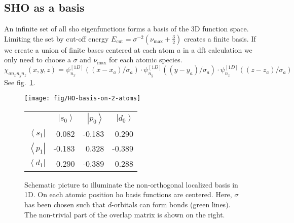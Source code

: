 \documentclass[oribibl]{llncs}
\newcommand{\um}[1]{_{\mathrm{#1}}}
\newcommand{\ket}[1]{\left| #1 \right\rangle}
\newcommand{\bra}[1]{\left\langle #1 \right|}
\begin{document}
\subsection{SHO as a basis}
An infinite set of all \ac{sho} eigenfunctions forms a basis of the 3D function space.
Limiting the set by cut-off energy $E\um{cut} = \sigma^{-2} (\nu\um{max} + \frac 32)$
creates a finite basis.
If we create a union of finite bases centered at each atom $a$ in a \ac{dft} calculation 
we only need to choose a $\sigma$ and $\nu\um{max}$ for each atomic species.
\begin{equation}
  \chi_{a n_x n_y n_z}(x,y,z) = \psi^{[1D]}_{n_x}((x - x_a)/\sigma_a) 
                          \cdot \psi^{[1D]}_{n_y}((y - y_a)/\sigma_a) 
                          \cdot \psi^{[1D]}_{n_z}((z - z_a)/\sigma_a)
  \label{eqn:localized-basis}
\end{equation}
See fig.~\ref{fig:HO-basis-on-2-atoms}.
%
\begin{figure}
  \begin{minipage}[c]{.58\textwidth}
	\texttt{[image: fig/HO-basis-on-2-atoms]} %
  \end{minipage}\hfill
  \begin{minipage}[c]{.41\textwidth}
  

		\begin{tabular}{r rrr}
		\toprule
				    & $\ket{s_0}$ & $\ket{p_0}$ & $\ket{d_0}$ \\
				$\bra{s_1}$  &      0.082 &  -0.183 &  0.290  \\
				$\bra{p_1}$  &     -0.183 &   0.328 & -0.389  \\
				$\bra{d_1}$  &      0.290 &  -0.389 &  0.288  \\
		\bottomrule
		\end{tabular}

  \end{minipage}
  \label{fig:HO-basis-on-2-atoms}
  \caption{
Schematic picture to illuminate the non-orthogonal localized basis in 1D.
On each atomic position \ac{ho} basis functions are centered.
Here, $\sigma$ has been chosen such that $d$-orbitals can form bonds (green lines).
The non-trivial part of the overlap matrix is shown on the right.
  }
\end{figure}
%
%
\end{document}
